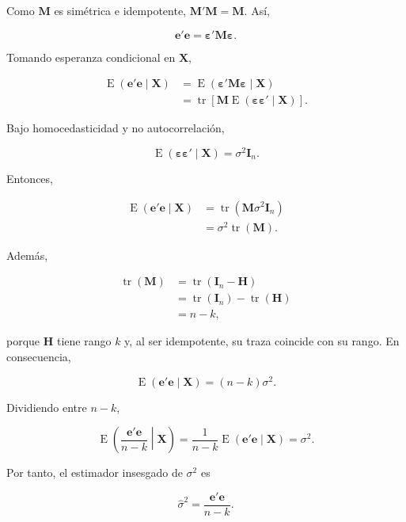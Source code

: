 \documentclass[11pt,a4paper]{article}
\DeclareMathOperator{\E}{E}
\begin{document}
Como \(\mathbf{M}\) es simétrica e idempotente, \(\mathbf{M}'\mathbf{M}=\mathbf{M}\). Así,

\[
\mathbf{e}'\mathbf{e}=\boldsymbol{\varepsilon}'\mathbf{M}\boldsymbol{\varepsilon}.
\]

Tomando esperanza condicional en \(\mathbf{X}\),

\begin{align*}
\E(\mathbf{e}'\mathbf{e}\mid\mathbf{X})
&=\E(\boldsymbol{\varepsilon}'\mathbf{M}\boldsymbol{\varepsilon}\mid\mathbf{X}) \\
&=\operatorname{tr}\left[\mathbf{M}\E(\boldsymbol{\varepsilon}\boldsymbol{\varepsilon}'\mid\mathbf{X})\right].
\end{align*}

Bajo homocedasticidad y no autocorrelación,

\[
\E(\boldsymbol{\varepsilon}\boldsymbol{\varepsilon}'\mid\mathbf{X})=\sigma^2\mathbf{I}_n.
\]

Entonces,

\begin{align*}
\E(\mathbf{e}'\mathbf{e}\mid\mathbf{X})
&=\operatorname{tr}(\mathbf{M}\sigma^2\mathbf{I}_n) \\
&=\sigma^2\operatorname{tr}(\mathbf{M}).
\end{align*}

Además,

\begin{align*}
\operatorname{tr}(\mathbf{M})
&=\operatorname{tr}(\mathbf{I}_n-\mathbf{H}) \\
&=\operatorname{tr}(\mathbf{I}_n)-\operatorname{tr}(\mathbf{H}) \\
&=n-k,
\end{align*}

porque \(\mathbf{H}\) tiene rango \(k\) y, al ser idempotente, su traza coincide con su rango. En consecuencia,

\begin{resultado}
\[
\boxed{\E(\mathbf{e}'\mathbf{e}\mid\mathbf{X})=(n-k)\sigma^2}.
\]
\end{resultado}

Dividiendo entre \(n-k\),

\[
\E\left(\frac{\mathbf{e}'\mathbf{e}}{n-k}\middle|\mathbf{X}\right)
=\frac{1}{n-k}\E(\mathbf{e}'\mathbf{e}\mid\mathbf{X})
=\sigma^2.
\]

Por tanto, el estimador insesgado de \(\sigma^2\) es

\[
\boxed{\hat{\sigma}^2 = \frac{\mathbf{e}'\mathbf{e}}{n - k}}.
\]
\end{document}
